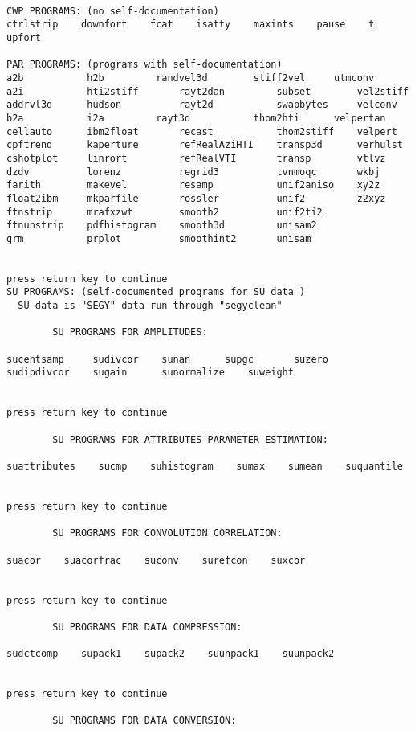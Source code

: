 
{\small\begin{verbatim}

CWP PROGRAMS: (no self-documentation)
ctrlstrip    downfort    fcat    isatty    maxints    pause    t    upfort  

PAR PROGRAMS: (programs with self-documentation)
a2b  	      h2b  	      randvel3d        stiff2vel     utmconv  
a2i  	      hti2stiff       rayt2dan         subset        vel2stiff  
addrvl3d      hudson  	      rayt2d  	       swapbytes     velconv  
b2a  	      i2a  	      rayt3d  	       thom2hti      velpertan  
cellauto      ibm2float       recast  	       thom2stiff    velpert  
cpftrend      kaperture       refRealAziHTI    transp3d      verhulst  
cshotplot     linrort         refRealVTI       transp        vtlvz  
dzdv  	      lorenz  	      regrid3          tvnmoqc       wkbj  
farith        makevel         resamp  	       unif2aniso    xy2z  
float2ibm     mkparfile       rossler          unif2  	     z2xyz  
ftnstrip      mrafxzwt        smooth2          unif2ti2  
ftnunstrip    pdfhistogram    smooth3d         unisam2  
grm  	      prplot  	      smoothint2       unisam  


press return key to continue
SU PROGRAMS: (self-documented programs for SU data )
  SU data is "SEGY" data run through "segyclean"
 
        SU PROGRAMS FOR AMPLITUDES:
 
sucentsamp     sudivcor    sunan  	  supgc       suzero  
sudipdivcor    sugain      sunormalize    suweight  


press return key to continue
 
        SU PROGRAMS FOR ATTRIBUTES PARAMETER_ESTIMATION:
 
suattributes  	sucmp    suhistogram  	sumax    sumean    suquantile  


press return key to continue
 
        SU PROGRAMS FOR CONVOLUTION CORRELATION:
 
suacor    suacorfrac  	suconv    surefcon    suxcor  


press return key to continue
 
        SU PROGRAMS FOR DATA COMPRESSION:
 
sudctcomp    supack1  	supack2    suunpack1  	suunpack2  


press return key to continue
 
        SU PROGRAMS FOR DATA CONVERSION:
 

\end{verbatim}}
